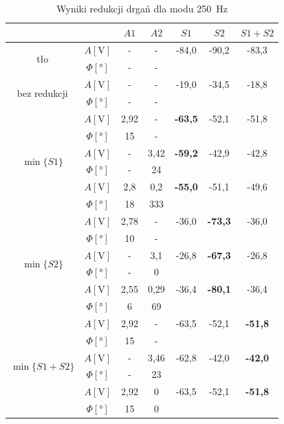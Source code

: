 \documentclass[polish,a4paper,11pt]{mwart}
\begin{document}
\begin{table}[!tbh]
  \centering
  \caption{Wyniki redukcji drgań dla modu \SI{250}{\hertz}}
  \label{tab:red1}
  \begin{tabular}{|c|c|c|c|c|c|c|}
    \cline{3-7}
    \multicolumn{2}{c|}{}&$A1$&$A2$&$S1$&$S2$&$S1+S2$\\\hline
    \multirow{2}{*}{tło}               &   $A [\si{\V}]$ & - & - & -84,0 & -90,2 & -83,3 \\\cline{2-7}
				       &$\Phi [\si{\degree}]$ & - & - & \multicolumn{3}{c}{}\\\hline
    \multirow{2}{*}{bez redukcji} &   $A [\si{\V}]$ & - & - & -19,0 & -34,5 & -18,8 \\\cline{2-7}
				       &$\Phi [\si{\degree}]$ & - & - & \multicolumn{3}{c}{}\\\hline
    \multirow{6}{*}{$\min\{S1\}$}      &   $A [\si{\V}]$ & 2,92 & - & \textbf{-63,5} & -52,1 & -51,8 \\\cline{2-7}
				       &$\Phi [\si{\degree}]$ & 15 & - & \multicolumn{3}{c}{}\\\cline{2-7}
				       &   $A [\si{\V}]$ & - & 3,42 & \textbf{-59,2} & -42,9 & -42,8 \\\cline{2-7}
				       &$\Phi [\si{\degree}]$ & - & 24 & \multicolumn{3}{c}{}\\\cline{2-7}
				       &   $A [\si{\V}]$ & 2,8 & 0,2 & \textbf{-55,0} & -51,1 & -49,6 \\\cline{2-7}
				       &$\Phi [\si{\degree}]$ & 18 & 333 & \multicolumn{3}{c}{}\\\hline
    \multirow{6}{*}{$\min\{S2\}$}      &   $A [\si{\V}]$ & 2,78 & - & -36,0 & \textbf{-73,3} & -36,0\\\cline{2-7}
				       &$\Phi [\si{\degree}]$ & 10 & - & \multicolumn{3}{c}{}\\\cline{2-7}
				       &   $A [\si{\V}]$ & - & 3,1 & -26,8 & \textbf{-67,3} & -26,8 \\\cline{2-7}
				       &$\Phi [\si{\degree}]$ & - & 0 & \multicolumn{3}{c}{}\\\cline{2-7}
				       &   $A [\si{\V}]$ & 2,55 & 0,29 & -36,4 & \textbf{-80,1} & -36,4 \\\cline{2-7}
				       &$\Phi [\si{\degree}]$ & 6 & 69 & \multicolumn{3}{c}{}\\\hline
    \multirow{6}{*}{$\min\{S1+S2\}$}   &   $A [\si{\V}]$ & 2,92 & - & -63,5  & -52,1 & \textbf{-51,8}\\\cline{2-7}
				       &$\Phi [\si{\degree}]$ & 15 & - & \multicolumn{3}{c}{}\\\cline{2-7}
				       &   $A [\si{\V}]$ & - & 3,46 & -62,8 & -42,0 & \textbf{-42,0} \\\cline{2-7}
				       &$\Phi [\si{\degree}]$ & - & 23 & \multicolumn{3}{c}{}\\\cline{2-7}
				       &   $A [\si{\V}]$ & 2,92 & 0 & -63,5 & -52,1 & \textbf{-51,8} \\\cline{2-7}
				       &$\Phi [\si{\degree}]$ & 15 & 0 & \multicolumn{3}{c}{}\\\cline{1-4}
  \end{tabular}
\end{table}
\end{document}
